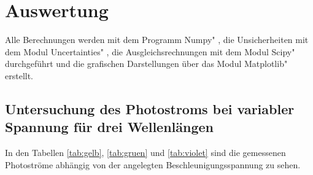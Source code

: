 \section{Auswertung}
\label{sec:Auswertung}
Alle Berechnungen werden mit dem Programm \glqq Numpy" \cite{numpy}, die Unsicherheiten mit dem Modul \glqq Uncertainties" \cite{uncertainties}, die Ausgleichsrechnungen mit dem Modul \glqq Scipy" \cite{scipy} durchgeführt und die grafischen Darstellungen über das Modul \glqq Matplotlib" \cite{matplotlib} erstellt.
\subsection{Untersuchung des Photostroms bei variabler Spannung für drei Wellenlängen}

In den Tabellen \ref{tab:gelb}, \ref{tab:gruen} und \ref{tab:violet} sind die gemessenen Photoströme abhängig von der angelegten Beschleunigungsspannung zu sehen. 

